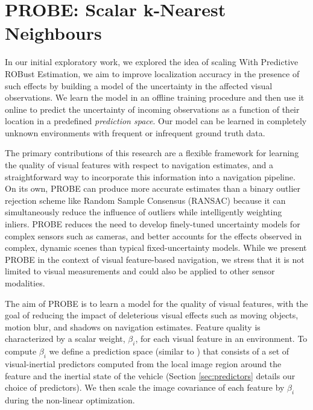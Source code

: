 \section{PROBE: Scalar k-Nearest Neighbours}

In our initial exploratory work, we explored the idea of scaling 
With Predictive ROBust Estimation, we aim to improve localization accuracy in the presence of such effects by building a model of the uncertainty in the affected visual observations. 
We learn the model in an offline training procedure and then use it online to predict the uncertainty of incoming observations as a function of their location in a predefined \emph{prediction space}.
Our model can be learned in completely unknown environments with frequent or infrequent ground truth data.
 

The primary contributions of this research are a flexible framework for learning the quality of visual features with respect to navigation estimates, and a straightforward way to incorporate this information into a navigation pipeline. On its own, PROBE can produce more accurate estimates than a binary outlier rejection scheme like Random Sample Consensus (RANSAC) because it can simultaneously reduce the influence of outliers while intelligently weighting inliers. PROBE reduces the need to develop finely-tuned uncertainty models for complex sensors such as cameras, and better accounts for the effects observed in complex, dynamic scenes than typical fixed-uncertainty models. While we present PROBE in the context of visual feature-based navigation, we stress that it is not limited to visual measurements and could also be applied to other sensor modalities.



The aim of PROBE is to learn a model for the quality of visual features, with the goal of reducing the impact of deleterious visual effects such as moving objects, motion blur, and shadows on navigation estimates.
Feature quality is characterized by a scalar weight, $\beta_i$, for each visual feature in an environment.
To compute $\beta_i$ we define a prediction space (similar to \cite{VegaBrown:ew}) that consists of a set of visual-inertial predictors computed from the local image region around the feature and the inertial state of the vehicle (Section \ref{sec:predictors} details our choice of predictors).
We then scale the image covariance of each feature by $\beta_i$ during the non-linear optimization.

